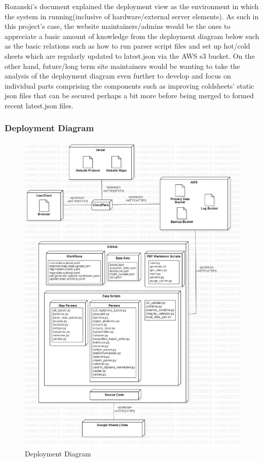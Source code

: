 Rozanski's document explained the deployment view as the environment in which the system in running(inclusive of hardware/external server elements). As such in this project's case, the website maintainers/admins would be the ones to appreciate a basic amount of knowledge from the deployment diagram below such as the basic relations such as how to run parser script files and set up hot/cold sheets which are regularly updated to latest.json via the AWS s3 bucket. On the other hand, future/long term site maintainers would be wanting to take the analysis of the deployment diagram even further to develop and focus on individual parts comprising the components such as improving coldsheets' static json files that can be secured perhaps a bit more before being merged to formed recent latest.json files.

\subsubsection{Deployment Diagram}

\begin{figure}[H]
  \centering
  \includegraphics[width=\linewidth]{img/deployment-diagram.jpg}
  \caption{Deployment Diagram}
\end{figure}

